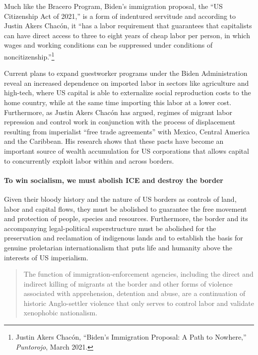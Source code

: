 Much like the Bracero Program, Biden's immigration proposal, the ``US Citizenship Act of 2021,'' is a form of indentured servitude and according to Justin Akers Chac\'{o}n, it ``has a labor requirement that guarantees that capitalists can have direct access to three to eight years of cheap labor per person, in which wages and working conditions can be suppressed under conditions of noncitizenship.''\footnote{Justin Akers Chac\'{o}n, ``Biden's Immigration Proposal: A Path to Nowhere,'' \emph{Puntorojo}, March 2021.}

Current plans to expand guestworker programs under the Biden Administration reveal an increased dependence on imported labor in sectors like agriculture and high-tech, where US capital is able to externalize social reproduction costs to the home country, while at the same time importing this labor at a lower cost. Furthermore, as Justin Akers Chac\'{o}n has argued, regimes of migrant labor repression and control work in conjunction with the process of displacement resulting from imperialist ``free trade agreements'' with Mexico, Central America and the Caribbean. His research shows that these pacts have become an important source of wealth accumulation for US corporations that allows capital to concurrently exploit labor within and across borders.

\paragraph{To win socialism, we must abolish ICE and destroy the border}

Given their bloody history and the nature of US borders as controls of land, labor and capital flows, they must be abolished to guarantee the free movement and protection of people, species and resources. Furthermore, the border and its accompanying legal-political superstructure must be abolished for the preservation and reclamation of indigenous lands and to establish the basis for genuine proletarian internationalism that puts life and humanity above the interests of US imperialism.

\blockquote{The function of immigration-enforcement agencies, including the direct and indirect killing of migrants at the border and other forms of violence associated with apprehension, detention and abuse, are a continuation of historic Anglo-settler violence that only serves to control labor and validate xenophobic nationalism.}

